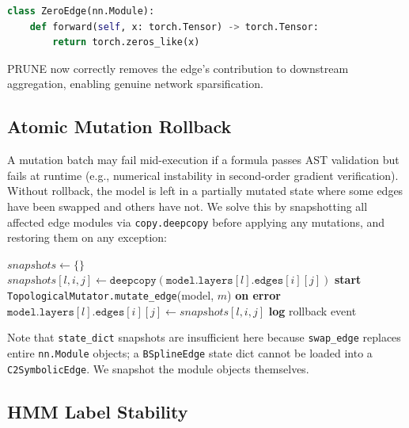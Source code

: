 \documentclass[11pt,a4paper]{article}
\begin{document}
\begin{lstlisting}[language=Python]
class ZeroEdge(nn.Module):
    def forward(self, x: torch.Tensor) -> torch.Tensor:
        return torch.zeros_like(x)
\end{lstlisting}

PRUNE now correctly removes the edge's contribution to downstream aggregation, enabling genuine network sparsification.

\subsection{Atomic Mutation Rollback}

A mutation batch may fail mid-execution if a formula passes AST validation but fails at runtime (e.g., numerical instability in second-order gradient verification). Without rollback, the model is left in a partially mutated state where some edges have been swapped and others have not. We solve this by snapshotting all affected edge modules via \texttt{copy.deepcopy} before applying any mutations, and restoring them on any exception:

\begin{algorithm}
\caption{Atomic Mutation Application}
\begin{algorithmic}[1]
\State $\textit{snapshots} \leftarrow \{\}$
    \State $\textit{snapshots}[l,i,j] \leftarrow \texttt{deepcopy}(\texttt{model.layers}[l].\texttt{edges}[i][j])$
\EndFor
\State \textbf{start}
    \State \texttt{TopologicalMutator.mutate\_edge}(model, $m$)
\EndFor
\State \textbf{on error}
    \State $\texttt{model.layers}[l].\texttt{edges}[i][j] \leftarrow \textit{snapshots}[l,i,j]$
\EndFor
\State \textbf{log} rollback event
\end{algorithmic}
\end{algorithm}

Note that \texttt{state\_dict} snapshots are insufficient here because \texttt{swap\_edge} replaces entire \texttt{nn.Module} objects; a \texttt{BSplineEdge} state dict cannot be loaded into a \texttt{C2SymbolicEdge}. We snapshot the module objects themselves.

\subsection{HMM Label Stability}
\end{document}
